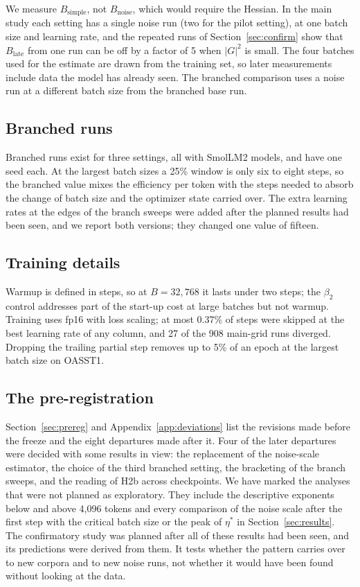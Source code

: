 \documentclass[10pt]{article}
\newcommand{\bsimple}{B_{\mathrm{simple}}}
\newcommand{\bnoise}{B_{\mathrm{noise}}}
\newcommand{\blate}{B_{\mathrm{late}}}
\begin{document}
We measure $\bsimple$, not $\bnoise$, which would require the Hessian. In the main study each setting has a single noise run (two for the pilot setting), at one batch size and learning rate, and the repeated runs of Section~\ref{sec:confirm} show that $\blate$ from one run can be off by a factor of 5 when $|G|^2$ is small. The four batches used for the estimate are drawn from the training set, so later measurements include data the model has already seen. The branched comparison uses a noise run at a different batch size from the branched base run.

\subsection{Branched runs}

Branched runs exist for three settings, all with SmolLM2 models, and have one seed each. At the largest batch sizes a 25\% window is only six to eight steps, so the branched value mixes the efficiency per token with the steps needed to absorb the change of batch size and the optimizer state carried over. The extra learning rates at the edges of the branch sweeps were added after the planned results had been seen, and we report both versions; they changed one value of fifteen.

\subsection{Training details}

Warmup is defined in steps, so at $B = 32{,}768$ it lasts under two steps; the $\beta_2$ control addresses part of the start-up cost at large batches but not warmup. Training uses fp16 with loss scaling; at most 0.37\% of steps were skipped at the best learning rate of any column, and 27 of the 908 main-grid runs diverged. Dropping the trailing partial step removes up to 5\% of an epoch at the largest batch size on OASST1.

\subsection{The pre-registration}

Section~\ref{sec:prereg} and Appendix~\ref{app:deviations} list the revisions made before the freeze and the eight departures made after it. Four of the later departures were decided with some results in view: the replacement of the noise-scale estimator, the choice of the third branched setting, the bracketing of the branch sweeps, and the reading of H2b across checkpoints. We have marked the analyses that were not planned as exploratory. They include the descriptive exponents below and above 4,096 tokens and every comparison of the noise scale after the first step with the critical batch size or the peak of $\eta^*$ in Section~\ref{sec:results}. The confirmatory study was planned after all of these results had been seen, and its predictions were derived from them. It tests whether the pattern carries over to new corpora and to new noise runs, not whether it would have been found without looking at the data.
\end{document}
